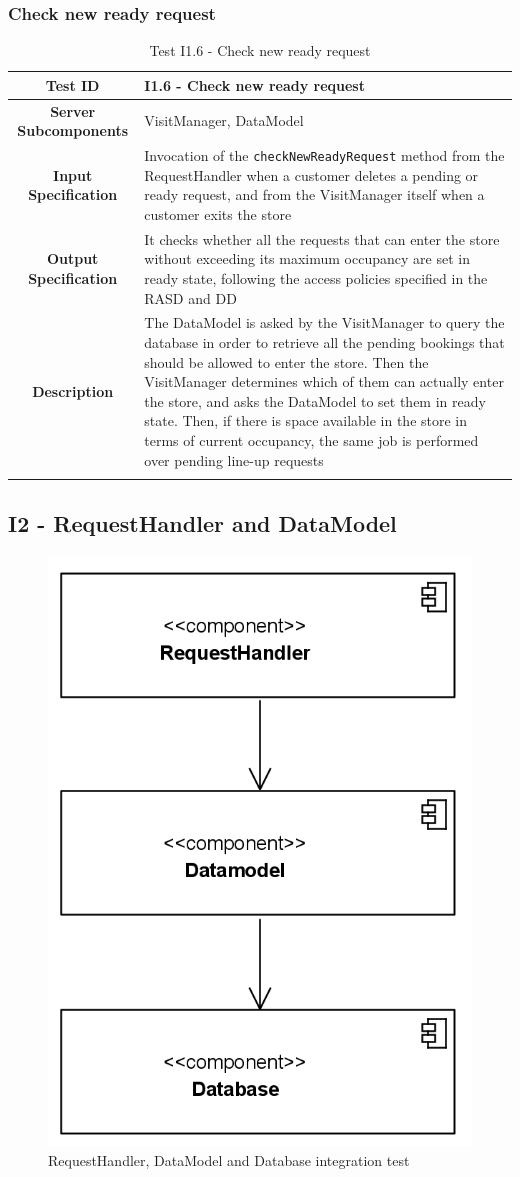 \documentclass[a4paper,oneside,11pt]{book}
\begin{document}
    \subsubsection{Check new ready request}
    \begin{longtable}[c]{|>{\bfseries{}}c|H{.5\textwidth}|}
        \hline
        Test ID & I1.6 - Check new ready request \\ \hline
        Server Subcomponents & VisitManager, DataModel \\ \hline
        Input Specification & Invocation of the \texttt{checkNewReadyRequest} method from the RequestHandler when a customer deletes a pending or ready request, and from the VisitManager itself when a customer exits the store \\ \hline
        Output Specification & It checks whether all the requests that can enter the store without exceeding its maximum occupancy are set in ready state, following the access policies specified in the RASD and DD \\ \hline
        Description & The DataModel is asked by the VisitManager to query the database in order to retrieve all the pending bookings that should be allowed to enter the store. Then the VisitManager determines which of them can actually enter the store, and asks the DataModel to set them in ready state. Then, if there is space available in the store in terms of current occupancy, the same job is performed over pending line-up requests \\ \hline
        \caption{Test I1.6 - Check new ready request}
        \label{table:test_I1.6}
    \end{longtable}
    
    \subsection{I2 - RequestHandler and DataModel}
    \begin{figure}[H]
        \centering
        \includegraphics[width=.5\textwidth, height=\textheight, keepaspectratio]{pictures/integration_diagrams/integration_requesthandler_datamodel.png}
        \caption{RequestHandler, DataModel and Database integration test}
        \label{figure:integration_requesthandler_datamodel}
    \end{figure}
    
\end{document}
